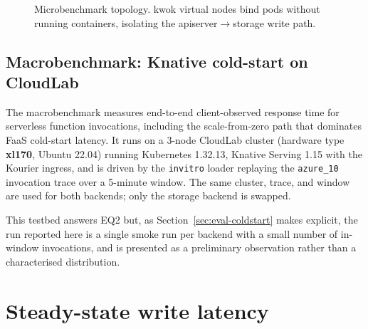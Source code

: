 \begin{figure}[h]
    \centering
    \caption{Microbenchmark topology. kwok virtual nodes bind pods without running containers, isolating the apiserver$\rightarrow$storage write path.}
    \label{fig:eval-micro-topo}
\end{figure}

\subsection{Macrobenchmark: Knative cold-start on CloudLab}
\label{sec:eval-macro-setup}

The macrobenchmark measures end-to-end client-observed response time for serverless function invocations, including the scale-from-zero path that dominates FaaS cold-start latency. It runs on a 3-node CloudLab cluster (hardware type \textbf{xl170}, Ubuntu 22.04) running Kubernetes 1.32.13, Knative Serving 1.15 with the Kourier ingress, and is driven by the \texttt{invitro} loader replaying the \texttt{azure\_10} invocation trace over a 5-minute window. The same cluster, trace, and window are used for both backends; only the storage backend is swapped.

This testbed answers EQ2 but, as Section~\ref{sec:eval-coldstart} makes explicit, the run reported here is a single smoke run per backend with a small number of in-window invocations, and is presented as a preliminary observation rather than a characterised distribution.

\section{Steady-state write latency}
\label{sec:eval-steady}

